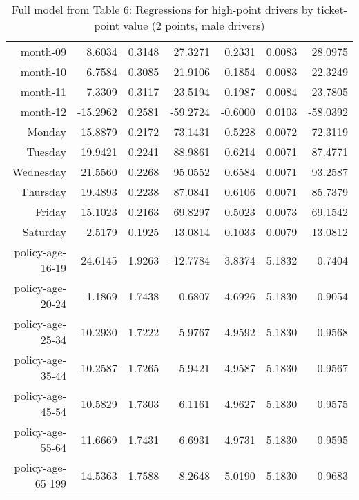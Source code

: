 \documentclass[10pt]{article}
\begin{document}
\begin{table}[ht]
\begin{tabular}{rrrrrrr}
  month-09 & 8.6034 & 0.3148 & 27.3271 & 0.2331 & 0.0083 & 28.0975 \\ 
  month-10 & 6.7584 & 0.3085 & 21.9106 & 0.1854 & 0.0083 & 22.3249 \\ 
  month-11 & 7.3309 & 0.3117 & 23.5194 & 0.1987 & 0.0084 & 23.7805 \\ 
  month-12 & -15.2962 & 0.2581 & -59.2724 & -0.6000 & 0.0103 & -58.0392 \\ 
  Monday & 15.8879 & 0.2172 & 73.1431 & 0.5228 & 0.0072 & 72.3119 \\ 
  Tuesday & 19.9421 & 0.2241 & 88.9861 & 0.6214 & 0.0071 & 87.4771 \\ 
  Wednesday & 21.5560 & 0.2268 & 95.0552 & 0.6584 & 0.0071 & 93.2587 \\ 
  Thursday & 19.4893 & 0.2238 & 87.0841 & 0.6106 & 0.0071 & 85.7379 \\ 
  Friday & 15.1023 & 0.2163 & 69.8297 & 0.5023 & 0.0073 & 69.1542 \\ 
  Saturday & 2.5179 & 0.1925 & 13.0814 & 0.1033 & 0.0079 & 13.0812 \\ 
  policy-age-16-19 & -24.6145 & 1.9263 & -12.7784 & 3.8374 & 5.1832 & 0.7404 \\ 
  policy-age-20-24 & 1.1869 & 1.7438 & 0.6807 & 4.6926 & 5.1830 & 0.9054 \\ 
  policy-age-25-34 & 10.2930 & 1.7222 & 5.9767 & 4.9592 & 5.1830 & 0.9568 \\ 
  policy-age-35-44 & 10.2587 & 1.7265 & 5.9421 & 4.9587 & 5.1830 & 0.9567 \\ 
  policy-age-45-54 & 10.5829 & 1.7303 & 6.1161 & 4.9627 & 5.1830 & 0.9575 \\ 
  policy-age-55-64 & 11.6669 & 1.7431 & 6.6931 & 4.9731 & 5.1830 & 0.9595 \\ 
  policy-age-65-199 & 14.5363 & 1.7588 & 8.2648 & 5.0190 & 5.1830 & 0.9683 \\ 
   \hline
\end{tabular}
\caption{Full model from Table 6: Regressions for high-point drivers by ticket-point value (2 points, male drivers)} 
\label{tab_6_2_pts_M}
\end{table}


\clearpage
\pagebreak



\end{document}
